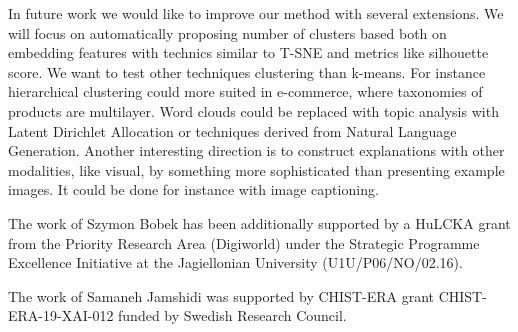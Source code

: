 \documentclass[
 twocolumn,
 hf,
]{ceurart}
\begin{document}

In future work we would like to improve our method with several extensions.
We will focus on automatically proposing number of clusters based both on embedding features with technics similar to T-SNE and metrics like silhouette score.
We want to test other techniques clustering than k-means.
For instance hierarchical clustering could more suited in e-commerce, where taxonomies of products are multilayer.
Word clouds could be replaced with topic analysis with Latent Dirichlet Allocation or techniques derived from Natural Language Generation.
Another interesting direction is to construct explanations with other modalities, like visual, by something more sophisticated than presenting example images.
It could be done for instance with image captioning.



\begin{acknowledgments}
The work of Szymon Bobek has been additionally supported by a HuLCKA grant from the Priority Research Area (Digiworld) under the Strategic Programme Excellence Initiative at the Jagiellonian University (U1U/P06/NO/02.16).

The work of Samaneh Jamshidi was supported by CHIST-ERA grant CHIST-ERA-19-XAI-012 funded by Swedish Research Council.
\end{acknowledgments}


\end{document}
